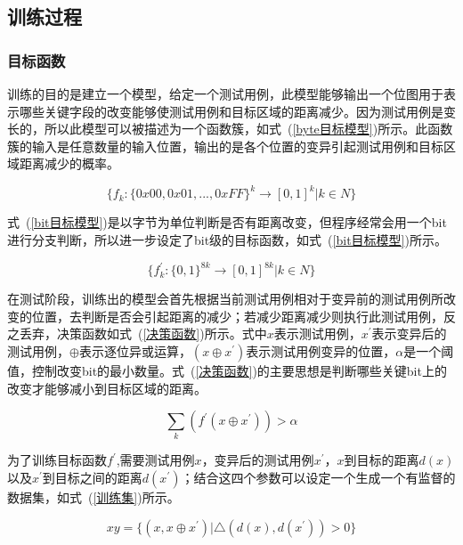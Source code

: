 \subsection{训练过程}

\subsubsection{目标函数}

训练的目的是建立一个模型，给定一个测试用例，此模型能够输出一个位图用于表示哪些关键字段的改变能够使测试用例和目标区域的距离减少。因为测试用例是变长的，所以此模型可以被描述为一个函数簇，如式~(\ref{byte目标模型})所示。此函数簇的输入是任意数量的输入位置，输出的是各个位置的变异引起测试用例和目标区域距离减少的概率。

\begin{equation}\label{byte目标模型}
\{f_{k}: \{0x00, 0x01, ...,0xFF \}^{k} \rightarrow [0,1]^{k} | k \in N \}
\end{equation}

式~(\ref{bit目标模型})是以字节为单位判断是否有距离改变，但程序经常会用一个bit进行分支判断，所以进一步设定了bit级的目标函数，如式~(\ref{bit目标模型})所示。

\begin{equation}\label{bit目标模型}
\{f^{'}_{k}: \{0,1 \}^{8k} \rightarrow [0,1]^{8k} | k \in N \}
\end{equation}

在测试阶段，训练出的模型会首先根据当前测试用例相对于变异前的测试用例所改变的位置，去判断是否会引起距离的减少；若减少距离减少则执行此测试用例，反之丢弃，决策函数如式~(\ref{决策函数})所示。式中$x$表示测试用例，$x^{'}$表示变异后的测试用例，$\oplus$表示逐位异或运算，$(x \oplus x^{'})$表示测试用例变异的位置，$\alpha$是一个阈值，控制改变bit的最小数量。式~(\ref{决策函数})的主要思想是判断哪些关键bit上的改变才能够减小到目标区域的距离。

\begin{equation}\label{决策函数}
\sum_{k}(f^{'}(x \oplus x^{'})) > \alpha
\end{equation}

为了训练目标函数$f^{'}$,需要测试用例$x$，变异后的测试用例$x^{'}$，$x$到目标的距离$d(x)$以及$x^{'}$到目标之间的距离$d(x^{'})$；结合这四个参数可以设定一个生成一个有监督的数据集，如式~(\ref{训练集})所示。

\begin{equation}\label{训练集}
xy = \{(x, x \oplus x^{'}) | \bigtriangleup (d(x),d(x^{'})) > 0 \}
\end{equation}

